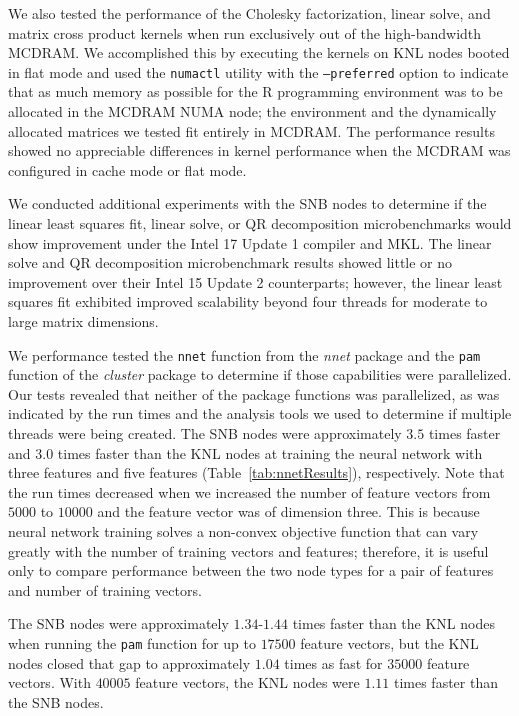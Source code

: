 We also tested the performance of the Cholesky factorization, linear
  solve, and matrix cross product kernels when run exclusively out of the
  high-bandwidth MCDRAM.
We accomplished this by executing the kernels on KNL nodes booted in
  flat mode and used the \texttt{numactl} utility with the \texttt{--preferred}
  option to indicate that as much memory as possible for the R programming
  environment was to be allocated in the MCDRAM NUMA node; the environment and
  the dynamically allocated matrices we tested fit entirely in MCDRAM.
The performance results showed no appreciable differences
  in kernel performance when the MCDRAM was configured in cache mode or flat
  mode.

We conducted additional experiments with the SNB nodes to determine if
  the linear least squares fit, linear solve, or QR decomposition microbenchmarks
  would show improvement under the Intel 17 Update 1 compiler and MKL.
The linear solve and QR decomposition microbenchmark results showed little
  or no improvement over their Intel 15 Update 2 counterparts; however, the
  linear least squares fit exhibited improved scalability beyond four threads
  for moderate to large matrix dimensions.

We performance tested the \texttt{nnet} function from the \textit{nnet} package
  and the \texttt{pam} function of the \textit{cluster} package to determine if
  those capabilities were parallelized.
Our tests revealed that neither of the package functions was parallelized, as
  was indicated by the run times and the analysis tools we used to determine if
  multiple threads were being created.
The SNB nodes were approximately $3.5$ times faster and $3.0$ times
  faster than the KNL nodes at training the neural network with
  three features and five features (Table~\ref{tab:nnetResults}), respectively.
Note that the run times decreased when we increased the number of feature
  vectors from $5000$ to $10000$ and the feature vector was of dimension three.
This is because neural network training solves a non-convex objective function
  that can vary greatly with the number of training vectors and features;
  therefore, it is useful only to compare performance between the two node types
  for a pair of features and number of training vectors.

The SNB nodes were approximately $1.34$-$1.44$ times faster than the KNL nodes
  when running the \texttt{pam} function for up to $17500$ feature vectors, but the KNL
  nodes closed that gap to approximately $1.04$ times as fast for $35000$
  feature vectors.
With $40005$ feature vectors, the KNL nodes were $1.11$ times faster than the
  SNB nodes.

